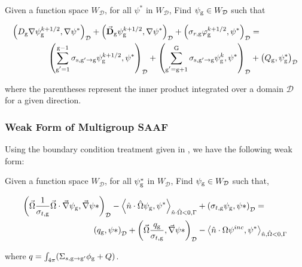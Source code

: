 Given a function space $W_\mathcal{D}$, for all $\psi^*$ in $W_\mathcal{D}$, Find $\psi_{\mathrm{g}} \in W_\mathcal{D}$ such that

\begin{equation}
 \begin{split}
  \left(D_{\mathrm{g}} \nabla \psi_{\mathrm{g}}^{k+1/2}, \nabla \psi^*\right)_\mathcal{D} + \left(\vec{\bf{D}}_{\mathrm{g}} \psi_{\mathrm{g}}^{k+1/2} , \nabla \psi^*\right)_\mathcal{D} +  \left(\sigma_{r,\mathrm{g}} \varphi_{\mathrm{g}}^{k+1/2}, \psi^*\right)_\mathcal{D} &=  \\
   \left(\sum\limits_{\substack{\mathrm{g}'=1}}^{\mathrm{g-1}} \sigma_{\mathrm{s},\mathrm{g}' \to\mathrm{g}}\psi_{\mathrm{g}}^{k+1/2}, \psi^*\right)_\mathcal{D} + \left(\sum\limits_{\substack{\mathrm{g}'=\mathrm{g}+1}}^{\mathrm{G}} \sigma_{\mathrm{s},\mathrm{g}' \to\mathrm{g}}\psi_{\mathrm{g}}^{k}, \psi^*\right)_\mathcal{D} 
  &+ \left(Q_{\mathrm{g}}, \psi^*_{\mathrm{g}}\right)_\mathcal{D} 
 \end{split}
 \label{k1/2}
\end{equation}

where the parentheses represent the inner product integrated over a domain $\mathcal{D}$ for a given direction.

\subsubsection{Weak Form of Multigroup SAAF}
Using the boundary condition treatment given in \cite{zheng-thesis}, we have the following weak form:

Given a function space $W_\mathcal{D}$, for all $\psi^*_{\mathrm{g}}$ in $W_\mathcal{D}$, Find $\psi_{\mathrm{g}} \in W_\mathcal{D}$ such that,

\begin{equation}
\begin{split}
        \left ( \vec{\Omega}\frac{1}{\sigma_{t, \mathrm{g}}}\vec{\Omega}\cdot \vec{\nabla}\psi_{\mathrm{g}}, \vec{\nabla}\psi* \right)_\mathcal{D} -     \left < \hat{n} \cdot \hat{\Omega}\psi_{\mathrm{g}}, \psi^* \right>_{\hat{n} \cdot \hat{\Omega} < 0, \Gamma} &+ \left ( \sigma_{t, \mathrm{g}} \psi_{\mathrm{g}}, \psi* \right )_\mathcal{D} = \\
        \left ( q_{\mathrm{g}}, \psi* \right)_\mathcal{D} + \left ( \vec{\Omega} \frac{q_{\mathrm{g}}}{\sigma_{t, \mathrm{g}}}, \vec{\nabla}\psi* \right)_\mathcal{D} &- \left < \hat{n} \cdot {\Omega} \psi^{inc}, \psi^* \right>_{\hat{n}, \hat{\Omega} <0, \Gamma} 
    \end{split}
\end{equation}

where $q = \int_{4\pi}(\Sigma_{s, \mathrm{g} \rightarrow \mathrm{g}'}\phi_{\mathrm{g}} + Q)$. 
